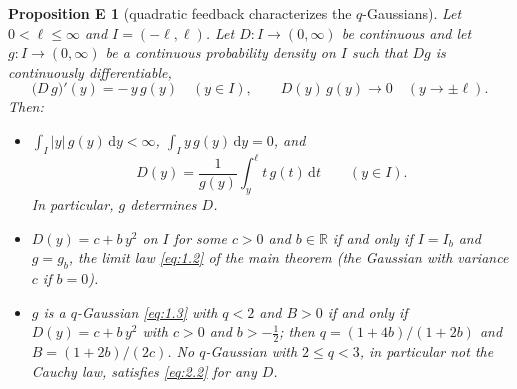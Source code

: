 \documentclass[aip,jmp,preprint,onecolumn,floatfix,superscriptaddress,nofootinbib,11pt]{revtex4-2}
\theoremstyle{plain}
\newtheorem*{propositionE}{Proposition E}
\theoremstyle{remark}
\numberwithin{equation}{section}
\newcommand{\dd}{\mathrm{d}}
\begin{document}
\begin{propositionE}[quadratic feedback characterizes the $q$-Gaussians]
Let $0<\ell\le\infty$ and $I=(-\ell,\ell)$. Let $D:I\to(0,\infty)$ be continuous and let $g:I\to(0,\infty)$ be a continuous probability density on $I$ such that $Dg$ is continuously differentiable,
\begin{equation}
\big(D\,g\big)'(y)=-\,y\,g(y)\quad(y\in I),\qquad D(y)\,g(y)\to0\quad(y\to\pm \ell).
\label{eq:2.2}
\end{equation}
Then:
\begin{itemize}
\item[(i)] $\int_I|y|\,g(y)\,\dd y<\infty$, $\int_I y\,g(y)\,\dd y=0$, and
\begin{equation}
D(y)=\frac{1}{g(y)}\int_y^{\ell}t\,g(t)\,\dd t\qquad(y\in I).
\label{eq:2.3}
\end{equation}
In particular, $g$ determines $D$.
\item[(ii)] $D(y)=c+b\,y^{2}$ on $I$ for some $c>0$ and $b\in\mathbb R$ if and only if $I=I_b$ and $g=g_b$, the limit law \eqref{eq:1.2} of the main theorem (the Gaussian with variance $c$ if $b=0$).
\item[(iii)] $g$ is a $q$-Gaussian \eqref{eq:1.3} with $q<2$ and $B>0$ if and only if $D(y)=c+b\,y^{2}$ with $c>0$ and $b>-\tfrac12$; then $q=(1+4b)/(1+2b)$ and $B=(1+2b)/(2c)$. No $q$-Gaussian with $2\le q<3$, in particular not the Cauchy law, satisfies \eqref{eq:2.2} for any $D$.
\end{itemize}
\end{propositionE}
\end{document}
